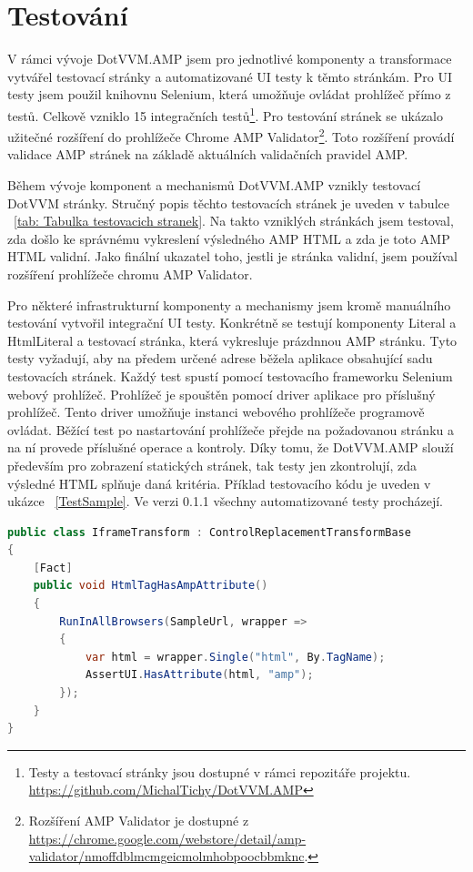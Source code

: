 \section{Testování}
V rámci vývoje DotVVM.AMP jsem pro jednotlivé komponenty a transformace vytvářel testovací stránky a automatizované UI testy k těmto stránkám. Pro UI testy jsem použil knihovnu Selenium, která umožňuje ovládat prohlížeč přímo z testů. Celkově vzniklo 15 integračních testů\footnote{Testy a testovací stránky jsou dostupné v rámci repozitáře projektu.\newline
\url{https://github.com/MichalTichy/DotVVM.AMP}}. Pro testování stránek se ukázalo užitečné rozšíření do prohlížeče Chrome AMP Validator\footnote{\label{AmpValidatorFoot} Rozšíření AMP Validator je dostupné z \url{https://chrome.google.com/webstore/detail/amp-validator/nmoffdblmcmgeicmolmhobpoocbbmknc}.}. Toto rozšíření provádí validace AMP stránek na základě aktuálních validačních pravidel AMP.

Během vývoje komponent a mechanismů DotVVM.AMP vznikly testovací DotVVM stránky. Stručný popis těchto testovacích stránek je uveden v tabulce ~\ref{tab: Tabulka testovacich stranek}. Na takto vzniklých stránkách jsem testoval, zda došlo ke správnému vykreslení výsledného AMP HTML a zda je toto AMP HTML validní. Jako finální ukazatel toho, jestli je stránka validní, jsem používal rozšíření prohlížeče chromu AMP Validator.

Pro některé infrastrukturní komponenty a mechanismy jsem kromě manuálního testování vytvořil integrační UI testy. Konkrétně se testují komponenty Literal a HtmlLiteral a testovací stránka, která vykresluje prázdnnou AMP stránku. Tyto testy vyžadují, aby na předem určené adrese běžela aplikace obsahující sadu testovacích stránek. Každý test spustí pomocí testovacího frameworku Selenium webový prohlížeč. Prohlížeč je spouštěn pomocí driver aplikace pro příslušný prohlížeč. Tento driver umožňuje instanci webového prohlížeče programově ovládat. Běžící test po nastartování prohlížeče přejde na požadovanou stránku a na ní provede příslušné operace a kontroly. Díky tomu, že DotVVM.AMP slouží především pro zobrazení statických stránek, tak testy jen zkontrolují, zda výsledné HTML splňuje daná kritéria. Příklad testovacího kódu je uveden v  ukázce ~\ref{TestSample}. Ve verzi 0.1.1 všechny automatizované testy procházejí.

\begin{lstlisting}[language=c#, caption=Ukázka testovacího kódu.,label=TestSample,captionpos=t]
public class IframeTransform : ControlReplacementTransformBase
{
    [Fact]
    public void HtmlTagHasAmpAttribute()
    {
        RunInAllBrowsers(SampleUrl, wrapper =>
        {
            var html = wrapper.Single("html", By.TagName);
            AssertUI.HasAttribute(html, "amp");
        });
    }
}
\end{lstlisting}

